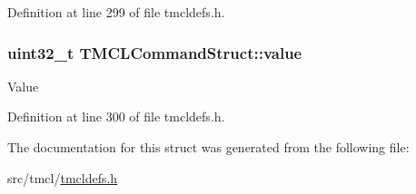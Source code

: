 Definition at line 299 of file tmcldefs.h.\hypertarget{structTMCLCommandStruct_a46541ffc394c6c80950436398ba13266}{
\subsubsection[{value}]{\setlength{\rightskip}{0pt plus 5cm}uint32\_\-t {\bf TMCLCommandStruct::value}}}
\label{structTMCLCommandStruct_a46541ffc394c6c80950436398ba13266}
Value 

Definition at line 300 of file tmcldefs.h.

The documentation for this struct was generated from the following file:\begin{DoxyCompactItemize}
\item 
src/tmcl/\hyperlink{tmcldefs_8h}{tmcldefs.h}\end{DoxyCompactItemize}
